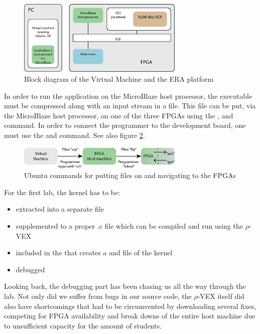 \begin{figure}[htb]%
\centering
\includegraphics[width=300px]{Pictures/platform}%
\caption{Block diagram of the Virtual Machine and the ERA platform}%
\label{fig:lelijk}%
\end{figure}

In order to run the application on the MicroBlaze host processor, the  executable must be compressed along with an input stream in a  file. This file can be put, via the MicroBlaze host processor, on one of the three FPGAs using the ,  and  command. In order to connect the programmer to the development board, one must use the  and  command. See also figure \ref{fig:hoppen}.


\begin{figure}[htb]%
\centering
\includegraphics[width=300px]{Pictures/hoprecht}%
\caption{Ubuntu commands for putting files on and navigating to the FPGAs}%
\label{fig:hoppen}%
\end{figure}

For the first lab, the  kernel has to be:
\begin{itemize}
	\item extracted into a separate file
	\item supplemented to a proper .c file which can be compiled and run using the $\rho$-VEX
	\item included in the  that creates a  and  file of the kernel
	\item debugged
\end{itemize}

Looking back, the debugging part has been chasing us all the way through the lab. Not only did we suffer from bugs in our source code, the $\rho$-VEX itself did also have shortcomings that had to be circumvented by downloading several fixes, competing for FPGA availability and break downs of the entire host machine due to unsufficient capacity for the amount of students.

